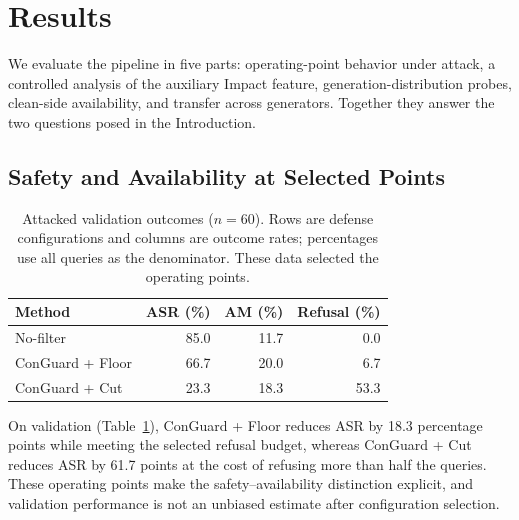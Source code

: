 \documentclass[sigconf]{aamas}
\begin{document}
\section{Results}
We evaluate the pipeline in five parts: operating-point behavior under attack, a controlled analysis of the auxiliary Impact feature, generation-distribution probes, clean-side availability, and transfer across generators. Together they answer the two questions posed in the Introduction.

\subsection{Safety and Availability at Selected Points}
\begin{table}[t]
\caption{Attacked validation outcomes ($n=60$). Rows are defense configurations and columns are outcome rates; percentages use all queries as the denominator. These data selected the operating points.}
\label{tab:val}
\centering
\begin{tabular}{lrrr}
\toprule
Method & ASR (\%) & AM (\%) & Refusal (\%)\\
\midrule
No-filter & 85.0 & 11.7 & 0.0\\
ConGuard + Floor & 66.7 & 20.0 & 6.7\\
ConGuard + Cut & 23.3 & 18.3 & 53.3\\
\bottomrule
\end{tabular}
\end{table}
On validation (Table~\ref{tab:val}), ConGuard + Floor reduces ASR by 18.3 percentage points while meeting the selected refusal budget, whereas ConGuard + Cut reduces ASR by 61.7 points at the cost of refusing more than half the queries. These operating points make the safety--availability distinction explicit, and validation performance is not an unbiased estimate after configuration selection.
\end{document}
